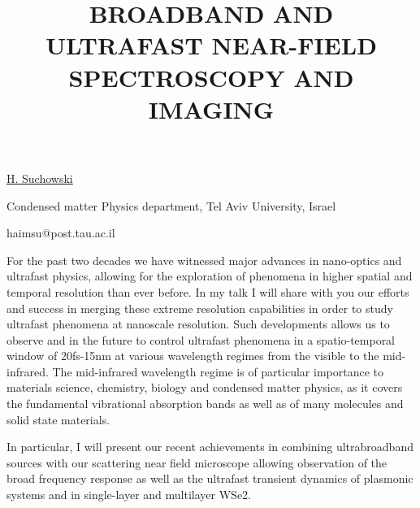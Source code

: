 \title{BROADBAND AND ULTRAFAST NEAR-FIELD SPECTROSCOPY AND IMAGING}

\underline{H. Suchowski} 

{\normalsize{\vspace{-4mm}
Condensed matter Physics department, Tel Aviv University, Israel

\email haimsu@post.tau.ac.il}}

For the past two decades we have witnessed major advances in nano-optics and ultrafast physics, allowing for the exploration of phenomena in higher spatial and temporal resolution than ever before. In my talk I will share with you our efforts and success in merging these extreme resolution capabilities in order to study ultrafast phenomena at nanoscale resolution. Such developments allows us to observe and in the future to control ultrafast phenomena in a spatio-temporal window of 20fs-15nm at various wavelength regimes from the visible to the mid-infrared. The mid-infrared wavelength regime is of particular importance to materials science, chemistry, biology and condensed matter physics, as it covers the fundamental vibrational absorption bands as well as of many molecules and solid state materials.

In particular, I will present our recent achievements in combining ultrabroadband sources with our scattering near field microscope allowing observation of the broad frequency response as well as the ultrafast transient dynamics of plasmonic systems and in single-layer and multilayer WSe2.

\vspace{\baselineskip}